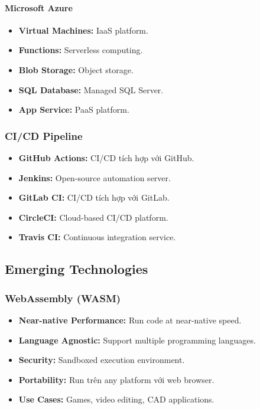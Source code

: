 \documentclass[a4paper,12pt]{report}
\begin{document}
\paragraph{Microsoft Azure}
\begin{itemize}
    \item \textbf{Virtual Machines:} IaaS platform.
    \item \textbf{Functions:} Serverless computing.
    \item \textbf{Blob Storage:} Object storage.
    \item \textbf{SQL Database:} Managed SQL Server.
    \item \textbf{App Service:} PaaS platform.
\end{itemize}

\subsubsection{CI/CD Pipeline}
\begin{itemize}
    \item \textbf{GitHub Actions:} CI/CD tích hợp với GitHub.
    \item \textbf{Jenkins:} Open-source automation server.
    \item \textbf{GitLab CI:} CI/CD tích hợp với GitLab.
    \item \textbf{CircleCI:} Cloud-based CI/CD platform.
    \item \textbf{Travis CI:} Continuous integration service.
\end{itemize}

\subsection{Emerging Technologies}

\subsubsection{WebAssembly (WASM)}
\begin{itemize}
    \item \textbf{Near-native Performance:} Run code at near-native speed.
    \item \textbf{Language Agnostic:} Support multiple programming languages.
    \item \textbf{Security:} Sandboxed execution environment.
    \item \textbf{Portability:} Run trên any platform với web browser.
    \item \textbf{Use Cases:} Games, video editing, CAD applications.
\end{itemize}
\end{document}
